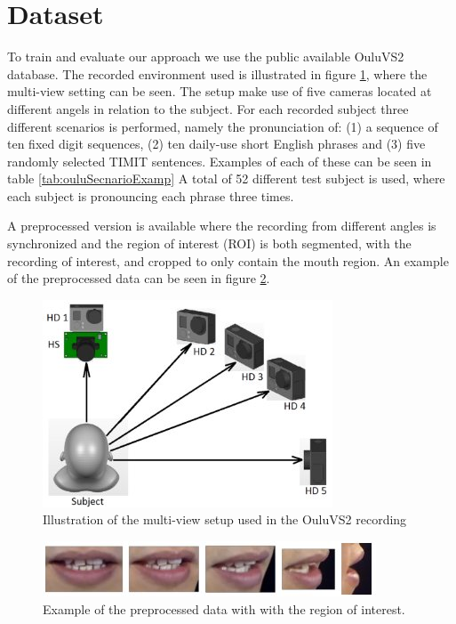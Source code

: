 \section{Dataset}
\label{sec:dataset}
To train and evaluate our approach we use the public available OuluVS2 database.
The recorded environment used is illustrated in figure \ref{fig:ouluMultiView}, where the multi-view setting can be seen.
The setup make use of five cameras located at different angels in relation to the subject.
For each recorded subject three different scenarios is performed, namely the pronunciation of: 
(1) a sequence of ten fixed digit sequences,
(2) ten daily-use short English phrases and
(3) five randomly selected TIMIT sentences.
Examples of each of these can be seen in table \ref{tab:ouluSecnarioExamp}
A total of 52 different test subject is used, where each subject is pronouncing each phrase three times.

A preprocessed version is available where the recording from different angles is synchronized and the region of interest (ROI) is both segmented, with the recording of interest, and cropped to only contain the mouth region.
An example of the preprocessed data can be seen in figure \ref{fig:ouluPreprocessed}.

\begin{figure}
    \centering
    \includegraphics[width=0.6\columnwidth]{fig/ouluMultiView.jpg}
    \caption{Illustration of the multi-view setup used in the OuluVS2 recording}
    \label{fig:ouluMultiView}
\end{figure}
\begin{figure}
    \centering
    \includegraphics[width=\columnwidth]{fig/ouluPreprocessed.jpg}
    \caption{Example of the preprocessed data with with the region of interest.}
    \label{fig:ouluPreprocessed}
\end{figure}


